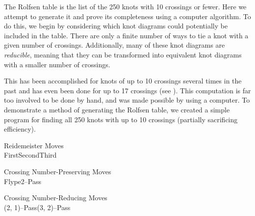 \begin{paper}

The Rolfsen table is the list of the 250 knots with 10 crossings or fewer.
Here we attempt to generate it and prove its completeness using a computer
algorithm.
To do this, we begin by considering which knot diagrams could potentially be
included in the table.
There are only a finite number of ways to tie a knot with a given number of
crossings.
Additionally, many of these knot diagrams are \textit{reducible}, meaning that
they can be transformed into equivalent knot diagrams with a smaller number of
crossings.

This has been accomplished for knots of up to 10 crossings several times in the
past and has even been done for up to 17 crossings (see \cite{htw}).
This computation is far too involved to be done by hand, and was made possible
by using a computer.
To demonstrate a method of generating the Rolfsen table, we created a simple
program for finding all 250 knots with up to 10 crossings (partially sacrificing
efficiency).

\begin{center}\begin{minipage}{\columnwidth}\begin{center}
Reidemeister Moves\vspace{0.5em}
\\\vspace{0.5em}
First\hspace{0.19\columnwidth}Second\hspace{0.17\columnwidth}Third\\\vspace{1em}
\end{center}\end{minipage}\end{center}
\begin{center}\begin{minipage}{\columnwidth}\begin{center}
Crossing Number-Preserving Moves\vspace{0.5em}
\\\vspace{0.5em}
Flype\hspace{0.3\columnwidth}2--Pass\\\vspace{1em}
\end{center}\end{minipage}\end{center}
\begin{center}\begin{minipage}{\columnwidth}\begin{center}
Crossing Number-Reducing Moves\vspace{0.5em}
\\\vspace{0.5em}
(2, 1)--Pass\hspace{0.2\columnwidth}(3, 2)--Pass
\end{center}\end{minipage}\end{center}


\end{paper}
